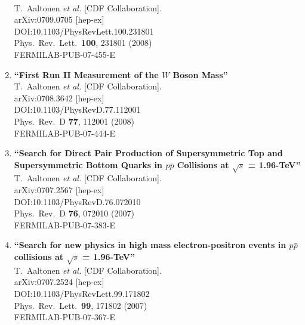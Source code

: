 \documentclass{article}
\begin{document}
\begin{enumerate}
  \\{}T.~Aaltonen {\it et al.} [CDF Collaboration].
  \\{}arXiv:0709.0705 [hep-ex]
  \\{}DOI:10.1103/PhysRevLett.100.231801
  \\{}Phys.\ Rev.\ Lett.\  {\bf 100}, 231801 (2008)
  \\{}FERMILAB-PUB-07-455-E
\item%
{\bf ``First Run II Measurement of the $W$ Boson Mass''}
  \\{}T.~Aaltonen {\it et al.} [CDF Collaboration].
  \\{}arXiv:0708.3642 [hep-ex]
  \\{}DOI:10.1103/PhysRevD.77.112001
  \\{}Phys.\ Rev.\ D {\bf 77}, 112001 (2008)
  \\{}FERMILAB-PUB-07-444-E
\item%
{\bf ``Search for Direct Pair Production of Supersymmetric Top and Supersymmetric Bottom Quarks in $p \bar{p}$ Collisions at $\sqrt{s}$ = 1.96-TeV''}
  \\{}T.~Aaltonen {\it et al.} [CDF Collaboration].
  \\{}arXiv:0707.2567 [hep-ex]
  \\{}DOI:10.1103/PhysRevD.76.072010
  \\{}Phys.\ Rev.\ D {\bf 76}, 072010 (2007)
  \\{}FERMILAB-PUB-07-383-E
\item%
{\bf ``Search for new physics in high mass electron-positron events in $p \bar{p}$ collisions at $\sqrt{s}$ = 1.96-TeV''}
  \\{}T.~Aaltonen {\it et al.} [CDF Collaboration].
  \\{}arXiv:0707.2524 [hep-ex]
  \\{}DOI:10.1103/PhysRevLett.99.171802
  \\{}Phys.\ Rev.\ Lett.\  {\bf 99}, 171802 (2007)
  \\{}FERMILAB-PUB-07-367-E

\end{enumerate}
\end{document}
